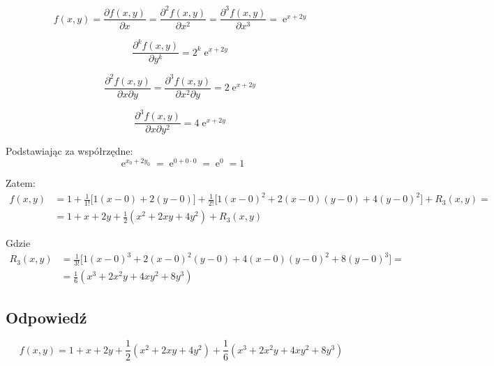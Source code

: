 \documentclass{article}
\newcommand{\partderiv}[2]{\frac{\partial #1}{\partial #2}}
\DeclareMathOperator{\?}{?}
\DeclareMathOperator{\e}{e}
\begin{document}
\begin{equation*}
   f(x,y) = \partderiv{f(x,y)}{x} =
   \frac{\partial^2 f(x,y)}{\partial x^2} =
   \frac{\partial^3 f(x,y)}{\partial x^3} = \e^{x+2y}
\end{equation*}

\begin{equation*}
   \frac{\partial^k f(x,y)}{\partial y^k} = 2^k \e^{x+2y}
\end{equation*}

\begin{equation*}
   \frac{\partial^2 f(x,y)}{\partial x \partial y} =
   \frac{\partial^3 f(x,y)}{\partial x^2 \partial y} = 2 \e^{x+2y}
\end{equation*}

\begin{equation*}
   \frac{\partial^3 f(x,y)}{\partial x \partial y^2} = 4 \e^{x+2y}
\end{equation*}

Podstawiając za współrzędne:
\begin{equation*}
   \e^{x_0 + 2y_0} = \e^{0 + 0\cdot 0} = \e^0 = 1
\end{equation*}

Zatem:
\begin{equation*}
   \begin{aligned}
      f(x,y)
      &= 1 + \frac{1}{1!}\big[1(x-0) + 2(y-0)\big] + \frac{1}{2!}\big[1(x-0)^2 + 2(x-0)(y-0) + 4(y-0)^2\big] + R_3(x,y) = \\
      &= 1 + x + 2y + \frac{1}{2}(x^2 + 2xy + 4y^2) + R_3(x,y)
   \end{aligned}
\end{equation*}

Gdzie
\begin{equation*}
   \begin{aligned}
      R_3(x,y)
      &= \frac{1}{3!}\big[1(x-0)^3 + 2(x-0)^2(y-0) + 4(x-0)(y-0)^2 + 8(y-0)^3\big] = \\
      &= \frac{1}{6}(x^3 + 2x^2 y + 4xy^2 + 8y^3)
   \end{aligned}
\end{equation*}

\subsection*{Odpowiedź}
\begin{equation*}
   f(x,y) = 1 + x + 2y + \frac{1}{2}(x^2 + 2xy + 4y^2)
   + \frac{1}{6}(x^3 + 2x^2 y + 4xy^2 + 8y^3)
\end{equation*}
\end{document}
